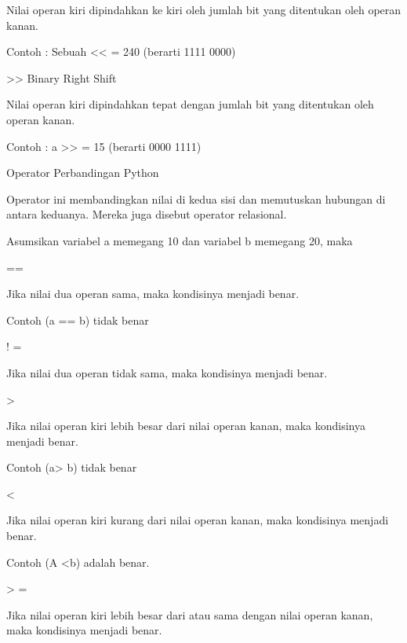 \noindent 
Nilai operan kiri dipindahkan ke kiri oleh jumlah bit yang ditentukan oleh operan kanan. \par
\noindent 
Contoh : Sebuah << = 240 (berarti 1111 0000) \par
\vspace{12pt}
\noindent 
>> Binary Right Shift \par
\noindent 
Nilai operan kiri dipindahkan tepat dengan jumlah bit yang ditentukan oleh operan kanan. \par
\noindent 
Contoh : a >> = 15 (berarti 0000 1111) \par
\vspace{12pt}
\noindent 
Operator Perbandingan Python \par
\vspace{12pt}
\noindent 
Operator ini membandingkan nilai di kedua sisi dan memutuskan hubungan di antara keduanya. $  $Mereka juga disebut operator relasional. \par
\vspace{12pt}
\noindent 
Asumsikan variabel a memegang 10 dan variabel b memegang 20, maka  \par
\vspace{12pt}
\noindent 
== \par
\noindent 
Jika nilai dua operan sama, maka kondisinya menjadi benar. \par
\noindent 
Contoh (a == b) tidak benar \par
\vspace{12pt}
\noindent 
! = \par
\noindent 
Jika nilai dua operan tidak sama, maka kondisinya menjadi benar. \par
\vspace{12pt}
\noindent 
> \par
\noindent 
Jika nilai operan kiri lebih besar dari nilai operan kanan, maka kondisinya menjadi benar. \par
\noindent 
Contoh (a> b) tidak benar \par
\vspace{12pt}
\noindent 
< \par
\noindent 
Jika nilai operan kiri kurang dari nilai operan kanan, maka kondisinya menjadi benar. \par
\noindent 
Contoh (A <b) adalah benar. \par
\vspace{12pt}
\noindent 
> = \par
\noindent 
Jika nilai operan kiri lebih besar dari atau sama dengan nilai operan kanan, maka kondisinya menjadi benar. \par
